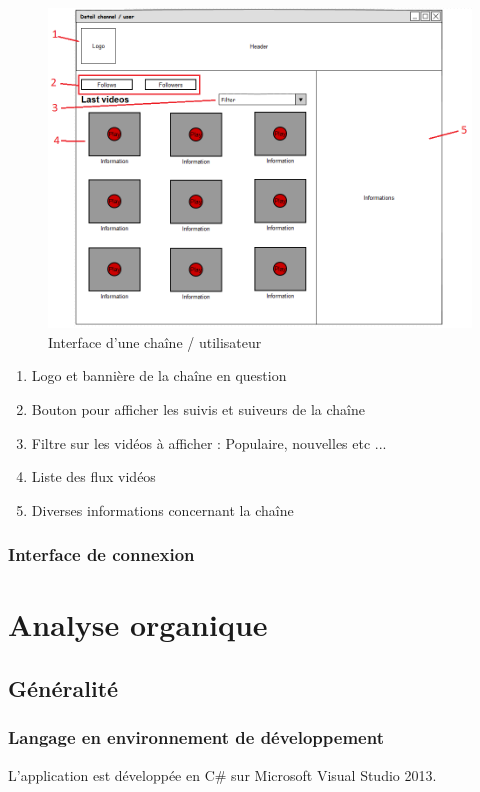 \documentclass[11pt]{report} %
\begin{document}
		\begin{figure}[h]
			\center
			\includegraphics[width=1\textwidth]{../img/channelInterfacenum.png}
			\caption{Interface d'une chaîne / utilisateur}
			\label{interfacechannel}
		\end{figure}
		
		\begin{enumerate}
			\item Logo et bannière de la chaîne en question
			\item Bouton pour afficher les suivis et suiveurs de la chaîne
			\item Filtre sur les vidéos à afficher : Populaire, nouvelles etc ...
			\item Liste des flux vidéos
			\item Diverses informations concernant la chaîne
		\end{enumerate}
		
		\subsection{Interface de connexion}
		
		
\chapter{Analyse organique}
	\section{Généralité}
		\subsection{Langage en environnement de développement}
		L'application est développée en C\# sur Microsoft Visual Studio 2013. 
		
\end{document}
